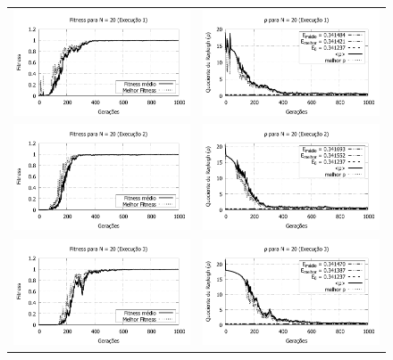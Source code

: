 	\begin{figure}[phtb]
	\centering
  \begin{tabular}{@{}cc@{}}
		\includegraphics[width=.40\textwidth]{figs/resultados/fitnessEL/N-20_E-1_fitness-extendido.pdf} &
    \includegraphics[width=.40\textwidth]{figs/resultados/fitnessEL/N-20_E-1_rho_extendido.pdf}   \\
		\includegraphics[width=.40\textwidth]{figs/resultados/fitnessEL/N-20_E-2_fitness-extendido.pdf} &
    \includegraphics[width=.40\textwidth]{figs/resultados/fitnessEL/N-20_E-2_rho_extendido.pdf}   \\
		\includegraphics[width=.40\textwidth]{figs/resultados/fitnessEL/N-20_E-3_fitness-extendido.pdf} &
    \includegraphics[width=.40\textwidth]{figs/resultados/fitnessEL/N-20_E-3_rho_extendido.pdf}   \\

\end{tabular}
\end{figure}
